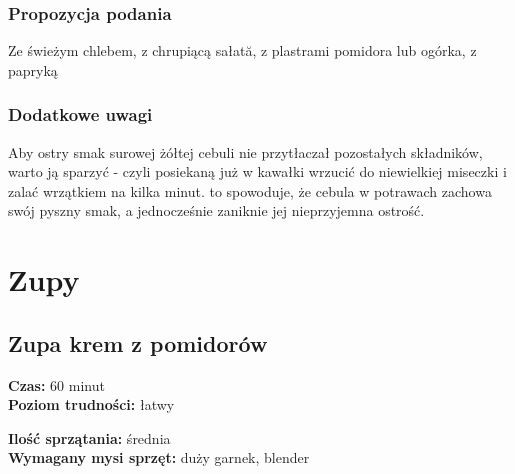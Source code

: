 \documentclass[a4paper,10pt]{book}
\begin{document}
\vspace{0.5cm} 

\small
\subsection*{Propozycja podania}
Ze świeżym chlebem, z chrupiącą sałată, z plastrami pomidora lub ogórka, z papryką

\vspace{0.3cm}

\subsection*{Dodatkowe uwagi}
Aby ostry smak surowej żółtej cebuli nie przytłaczał pozostałych składników, warto ją sparzyć - czyli posiekaną już w kawałki wrzucić do niewielkiej miseczki i zalać wrzątkiem na kilka minut. to spowoduje, że cebula w potrawach zachowa swój pyszny smak, a jednocześnie zaniknie jej nieprzyjemna ostrość.

\newpage 

\chapter{Zupy}

\section{Zupa krem z pomidorów}
\bigskip
\small
\begin{minipage}{0.45\textwidth}
    \noindent \textbf{Czas:} 60 minut \\
    \textbf{Poziom trudności:} łatwy
\end{minipage}
\begin{minipage}{0.45\textwidth}
    \noindent \textbf{Ilość sprzątania:} średnia\\
    \textbf{Wymagany mysi sprzęt:} duży garnek, blender
\end{minipage}
\normalsize
\vspace{0.5cm}
\end{document}
